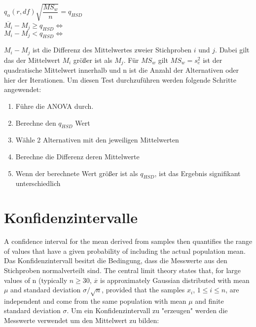 \begin{center}
  $q_{\alpha}(r, df){\sqrt{\dfrac{MS_w}{n}}} = q_{HSD}$ \\
  $\overline{M_i} - M_j \geq q_{HSD} \iff$  \\
  $M_i - M_j < q_{HSD} \iff$  
\end{center}

$M_i - M_j$ ist die Differenz des Mittelwertes zweier Stichproben $i$ und $j$.
Dabei gilt das der Mittelwert $M_i$ größer ist als $M_j$.
Für $MS_w$ gilt $MS_w = s^2_{e}$ ist der quadratische Mittelwert innerhalb und n ist die Anzahl
der Alternativen oder hier der Iterationen.
Um diesen Test durchzuführen werden folgende Schritte angewendet:

\begin{center}
  \begin{enumerate}
    \item Führe die ANOVA durch. 
    \item Berechne den $q_{HSD}$ Wert
    \item Wähle 2 Alternativen mit den jeweiligen Mittelwerten
    \item Berechne die Differenz deren Mittelwerte
    \item Wenn der berechnete Wert größer ist als $q_{HSD}$, ist das Ergebnis signifikant unterschiedlich 
  \end{enumerate}
\end{center}



\section{Konfidenzintervalle}

A confidence interval for the mean
derived from samples then quantifies the range of values that have a given probability of including the actual population mean.
Das Konfidenzintervall besitzt die Bedingung, dass die Messwerte aus den Stichproben normalverteilt sind.
The central limit theory states that, for large
values of n (typically $n \geq 30$, $\overline{x}$ is approximately Gaussian
distributed with mean $\mu$ and standard deviation $\sigma / \sqrt{n}$, provided that the samples $x_i$, $1 \leq i \leq n$, are independent and
come from the same population with mean $\mu$ and finite
standard deviation $\sigma$.
Um ein Konfidenzintervall zu "erzeugen" werden die Messwerte verwendet um den Mittelwert zu bilden:

